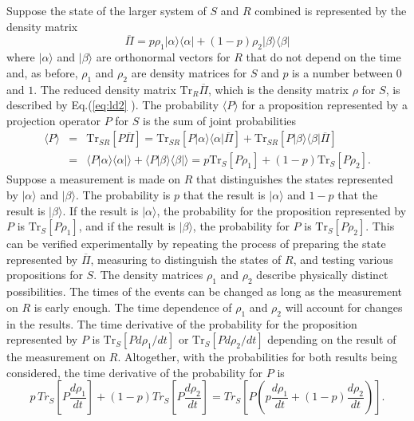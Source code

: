 \documentclass[pra, 12pt, showkeys, eqsecnum]{revtex4}
\newcommand {\Tr} {{\mbox{Tr}}}
\begin{document}
Suppose the state of the larger system of $S$ and $R$ combined is represented by the density matrix
\begin{equation}
\label{eq:ld4}
\overline{\Pi} = p\rho_1|\alpha \rangle \langle \alpha | + (1-p)\rho_2|\beta \rangle \langle \beta |
\end{equation}
where $|\alpha \rangle$ and $|\beta \rangle$ are orthonormal vectors for $R$ that do not depend on the time and, as before, $\rho_1$ and $\rho_2$ are density matrices for $S$ and $p$ is a number between $0$ and $1$. The reduced density matrix $\Tr_R \overline{\Pi }$, which is the density matrix $\rho $ for $S$, is described by Eq.(\ref{eq:ld2} ). The probability $\langle P \rangle $ for a proposition represented by a projection operator $P$ for $S$ is the sum of joint probabilities
\begin{eqnarray}
\label{eq:ld5}
\langle P\rangle & = & \Tr_{SR}[P\overline{\Pi}] = \Tr_{SR}[P|\alpha \rangle \langle \alpha |\overline{\Pi}]  +  \Tr_{SR}[P|\beta \rangle \langle \beta |\overline{\Pi}] \nonumber \\ & = & \langle P|\alpha \rangle \langle \alpha |\rangle  +  \langle P|\beta \rangle \langle\beta |\rangle
 = p\Tr_S[P\rho_1 ]  +  (1-p)\Tr_S[P\rho_2]. 
\end{eqnarray}
Suppose a measurement is made on $R$ that distinguishes the states represented by $|\alpha \rangle$ and $|\beta \rangle$. The probability is $p$  that the result is $|\alpha \rangle$  and $1-p$ that the result is $|\beta \rangle$. If the result is $|\alpha \rangle$, the probability for the proposition represented by $P$ is $\Tr_S[P\rho_1 ]$, and if the result is $|\beta \rangle$, the probability for $P$ is $\Tr_S[P\rho_2 ]$. This can be verified experimentally by repeating the process of preparing the state represented by $\overline{\Pi}$, measuring to distinguish the states of $R$, and testing various propositions for $S$. The density matrices $\rho_1$ and $\rho_2$ describe physically distinct possibilities. The times of the events can be changed as long as the measurement on $R$ is early enough. The time dependence of $\rho_1$ and $\rho_2$ will account for changes in the results. The time derivative of the probability for the proposition represented by $P$ is $\Tr_S[Pd\rho_1 /dt]$ or $\Tr_S[Pd\rho_2 /dt]$ depending on the result of the measurement on $R$. Altogether, with the probabilities for both results being considered, the time derivative of the probability for $P$ is
\begin{equation}
\label{prob12}
p\, Tr_S[P\frac{d\rho_{1}} {dt}] + (1-p)Tr_S[P\frac{d\rho_{2}} {dt}] = Tr_S[P(p\frac{d\rho_{1}} {dt} + (1-p)\frac{d\rho_{2}} {dt})].
\end{equation}
\end{document}
